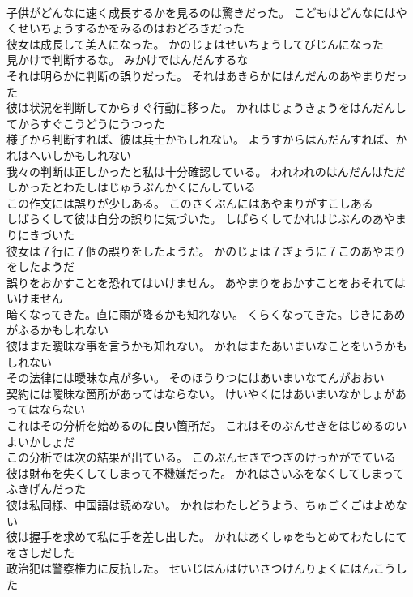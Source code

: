 \documentclass[8pt]{extreport}
\begin{document}
\begin{CJK}{UTF8}{min}
\\	子供がどんなに速く成長するかを見るのは驚きだった。	こどもはどんなにはやくせいちょうするかをみるのはおどろきだった 
\\	彼女は成長して美人になった。	かのじょはせいちょうしてびじんになった 
\\	見かけで判断するな。	みかけではんだんするな 
\\	それは明らかに判断の誤りだった。	それはあきらかにはんだんのあやまりだった 
\\	彼は状況を判断してからすぐ行動に移った。	かれはじょうきょうをはんだんしてからすぐこうどうにうつった 
\\	様子から判断すれば、彼は兵士かもしれない。	ようすからはんだんすれば、かれはへいしかもしれない 
\\	我々の判断は正しかったと私は十分確認している。	われわれのはんだんはただしかったとわたしはじゅうぶんかくにんしている 
\\	この作文には誤りが少しある。	このさくぶんにはあやまりがすこしある 
\\	しばらくして彼は自分の誤りに気づいた。	しばらくしてかれはじぶんのあやまりにきづいた 
\\	彼女は７行に７個の誤りをしたようだ。	かのじょは７ぎょうに７このあやまりをしたようだ 
\\	誤りをおかすことを恐れてはいけません。	あやまりをおかすことをおそれてはいけません 
\\	暗くなってきた。直に雨が降るかも知れない。	くらくなってきた。じきにあめがふるかもしれない 
\\	彼はまた曖昧な事を言うかも知れない。	かれはまたあいまいなことをいうかもしれない 
\\	その法律には曖昧な点が多い。	そのほうりつにはあいまいなてんがおおい 
\\	契約には曖昧な箇所があってはならない。	けいやくにはあいまいなかしょがあってはならない 
\\	これはその分析を始めるのに良い箇所だ。	これはそのぶんせきをはじめるのいよいかしょだ 
\\	この分析では次の結果が出ている。	このぶんせきでつぎのけっかがでている 
\\	彼は財布を失くしてしまって不機嫌だった。	かれはさいふをなくしてしまってふきげんだった 
\\	彼は私同様、中国語は読めない。	かれはわたしどうよう、ちゅごくごはよめない 
\\	彼は握手を求めて私に手を差し出した。	かれはあくしゅをもとめてわたしにてをさしだした 
\\	政治犯は警察権力に反抗した。	せいじはんはけいさつけんりょくにはんこうした 

\end{CJK}
\end{document}
